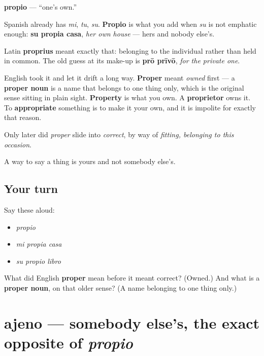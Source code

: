 \begin{cousinweb}
\textbf{propio} — \textquotedblleft{}one's own.\textquotedblright{}

Spanish already has \emph{mi}, \emph{tu}, \emph{su}. \textbf{Propio} is what you add when \emph{su} is not emphatic enough: \textbf{su propia casa}, \emph{her own house} — hers and nobody else's.

Latin \textbf{proprius} meant exactly that: belonging to the individual rather than held in common. The old guess at its make-up is \textbf{prō prīvō}, \emph{for the private one}.

English took it and let it drift a long way. \textbf{Proper} meant \emph{owned} first — a \textbf{proper noun} is a name that belongs to one thing only, which is the original sense sitting in plain sight. \textbf{Property} is what you own. A \textbf{proprietor} owns it. To \textbf{appropriate} something is to make it your own, and it is impolite for exactly that reason.

Only later did \emph{proper} slide into \emph{correct}, by way of \emph{fitting, belonging to this occasion}.
\end{cousinweb}

\begin{grammarlens}[title={What you've built}]
A way to say a thing is yours and not somebody else's.
\end{grammarlens}

\subsection*{Your turn}
Say these aloud:

\begin{itemize}
\raggedright
  \item \emph{propio}
  \item \emph{mi propia casa}
  \item \emph{su propio libro}
\end{itemize}

\begin{tcolorbox}[breakable,colback=teal!4,colframe=teal!35!black,title={Before you move on}]
What did English \textbf{proper} mean before it meant correct? (Owned.) And what is a \textbf{proper noun}, on that older sense? (A name belonging to one thing only.)
\end{tcolorbox}
\section[ajeno]{ajeno — somebody else's, the exact opposite of \emph{propio}}

